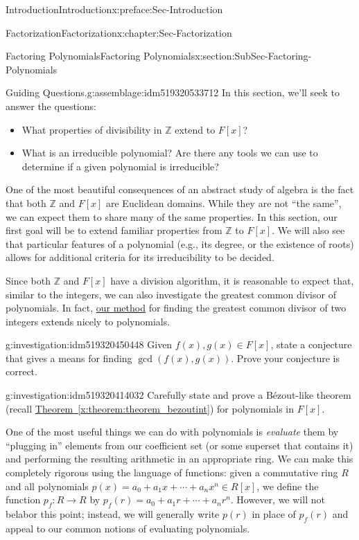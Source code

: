 \documentclass[oneside,10pt,]{book}
\newcommand{\xreffont}{\relax}
\numberwithin{equation}{section}
\def\Z{{\mathbb Z}}
\begin{document}
\begin{preface}{Introduction}{}{Introduction}{}{}{x:preface:Sec-Introduction}
\begin{chapterptx}{Factorization}{}{Factorization}{}{}{x:chapter:Sec-Factorization}
\begin{sectionptx}{Factoring Polynomials}{}{Factoring Polynomials}{}{}{x:section:SubSec-Factoring-Polynomials}
\begin{assemblage}{Guiding Questions.}{g:assemblage:idm519320533712}%
In this section, we'll seek to answer the questions: %
\begin{itemize}[label=\textbullet]
\item{}What properties of divisibility in \(\Z\) extend to \(F[x]\)?%
\item{}What is an irreducible polynomial? Are there any tools we can use to determine if a given polynomial is irreducible?%
\end{itemize}
%
\end{assemblage}
One of the most beautiful consequences of an abstract study of algebra is the fact that both \(\Z\) and \(F[x]\) are Euclidean domains. While they are not ``the same'', we can expect them to share many of the same properties. In this section, our first goal will be to extend familiar properties from \(\Z\) to \(F[x]\). We will also see that particular features of a polynomial (e.g., its degree, or the existence of roots) allows for additional criteria for its irreducibility to be decided.%
\par
Since both \(\Z\) and \(F[x]\) have a division algorithm, it is reasonable to expect that, similar to the integers, we can also investigate the greatest common divisor of polynomials. In fact, \hyperref[x:investigation:invest-euclid-alg-integers]{our method} for finding the greatest common divisor of two integers extends nicely to polynomials.%
\begin{investigation}{}{g:investigation:idm519320450448}%
Given \(f(x),g(x)\in F[x]\), state a conjecture that gives a means for finding \(\gcd(f(x),g(x))\). Prove your conjecture is correct.%
\end{investigation}
\begin{investigation}{}{g:investigation:idm519320414032}%
Carefully state and prove a Bézout-like theorem (recall \hyperref[x:theorem:theorem_bezoutint]{Theorem~{\xreffont\ref{x:theorem:theorem_bezoutint}}}) for polynomials in \(F[x]\).%
\end{investigation}
One of the most useful things we can do with polynomials is \emph{evaluate} them by ``plugging in'' elements from our coefficient set (or some superset that contains it) and performing the resulting arithmetic in an appropriate ring. We can make this completely rigorous using the language of functions: given a commutative ring \(R\) and all polynomials \(p(x) = a_0 + a_1 x + \cdots + a_n x^n \in R[x]\), we define the function \(p_f : R\to R\) by \(p_f(r) = a_0 + a_1 r + \cdots + a_n r^n \). However, we will not belabor this point; instead, we will generally write \(p(r)\) in place of \(p_f(r)\) and appeal to our common notions of evaluating polynomials.%

\end{sectionptx}
\end{chapterptx}
\end{preface}
\end{document}
